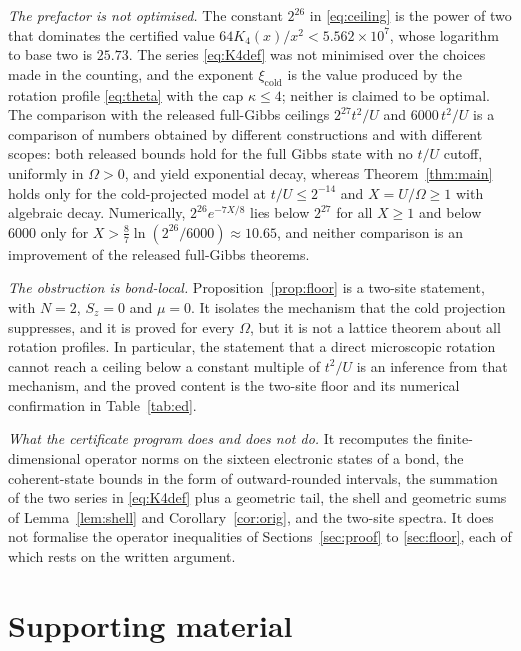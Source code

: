 \documentclass[11pt]{article}
\theoremstyle{plain}
\theoremstyle{definition}
\begin{document}
\emph{The prefactor is not optimised.} The constant $2^{26}$ in \eqref{eq:ceiling}
is the power of two that dominates the certified value
$64K_4(x)/x^{2}<5.562\times10^{7}$, whose logarithm to base two is $25.73$. The
series \eqref{eq:K4def} was not minimised over the choices made in the counting,
and the exponent $\xi_{\mathrm{cold}}$ is the value produced by the rotation
profile \eqref{eq:theta} with the cap $\kappa\le4$; neither is claimed to be
optimal. The comparison with the released full-Gibbs ceilings $2^{27}t^{2}/U$
\cite{rens2026a} and $6000\,t^{2}/U$ \cite{rens2026strong} is a comparison of
numbers obtained by different constructions and with different scopes: both
released bounds hold for the full Gibbs state with no $t/U$ cutoff, uniformly in
$\Omega>0$, and yield exponential decay, whereas Theorem~\ref{thm:main} holds
only for the cold-projected model at $t/U\le2^{-14}$ and $X=U/\Omega\ge1$ with
algebraic decay. Numerically, $2^{26}e^{-7X/8}$ lies below $2^{27}$ for all
$X\ge1$ and below $6000$ only for $X>\frac{8}{7}\ln(2^{26}/6000)\approx10.65$,
and neither comparison is an improvement of the released full-Gibbs theorems.

\emph{The obstruction is bond-local.} Proposition~\ref{prop:floor} is a two-site
statement, with $N=2$, $S_z=0$ and $\mu=0$. It isolates the mechanism that the
cold projection suppresses, and it is proved for every $\Omega$, but it is not a
lattice theorem about all rotation profiles. In particular, the statement that a
direct microscopic rotation cannot reach a ceiling below a constant multiple of
$t^{2}/U$ is an inference from that mechanism, and the proved content is the
two-site floor and its numerical confirmation in Table~\ref{tab:ed}.

\emph{What the certificate program does and does not do.} It recomputes the
finite-dimensional operator norms on the sixteen electronic states of a bond, the
coherent-state bounds in the form of outward-rounded intervals, the summation of
the two series in \eqref{eq:K4def} plus a geometric tail, the shell and geometric
sums of Lemma~\ref{lem:shell} and Corollary~\ref{cor:orig}, and the two-site
spectra. It does not formalise the operator inequalities of
Sections~\ref{sec:proof} to \ref{sec:floor}, each of which rests on the written
argument.

\section{Supporting material}\label{sec:supp}
\end{document}
